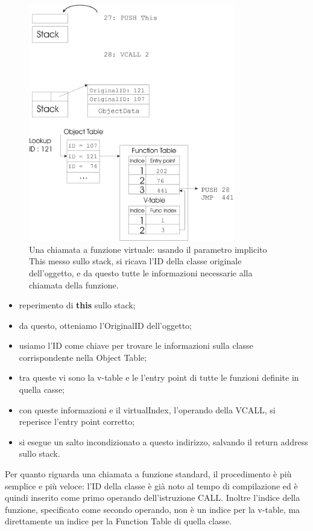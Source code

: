 \documentclass[a4paper, 11pt]{article}
\begin{document}
\begin{figure}[ht]
\centering
\includegraphics[width=0.8\textwidth]{vcall.eps}
\caption{Una chiamata a funzione virtuale: usando il parametro implicito This messo sullo stack, 
si ricava l'ID della classe originale dell'oggetto, e da questo tutte le informazioni necessarie alla chiamata della funzione.}
\label{fig:vcall}
\end{figure}


\begin{itemize}
\item reperimento di \textbf{this} sullo stack;
\item da questo, otteniamo l'OriginalID dell'oggetto;
\item usiamo l'ID come chiave per trovare le informazioni sulla classe corrispondente nella Object Table;
\item tra queste vi sono la v-table e le l'entry point di tutte le funzioni definite in quella casse;
\item con queste informazioni e il virtualIndex, l'operando della VCALL, si reperisce l'entry point corretto;
\item si esegue un salto incondizionato a questo indirizzo, salvando il return address sullo stack.
\end{itemize}

Per quanto riguarda una chiamata a funzione standard, il procedimento \`e pi\`u semplice e pi\`u veloce: l'ID della classe \`e gi\`a noto al tempo di compilazione ed \`e quindi inserito come primo operando dell'istruzione CALL. Inoltre l'indice della funzione, specificato come secondo operando, non \`e un indice per la v-table, ma direttamente un indice per la Function Table di quella classe.
\end{document}
